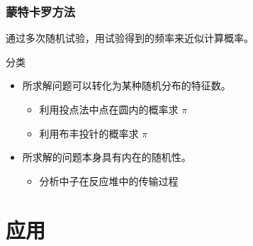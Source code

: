 \documentclass{beamer}
\begin{document}
\begin{frame}
    \frametitle{蒙特卡罗方法}

    \begin{definition}
        通过多次随机试验，用试验得到的频率来近似计算概率。
    \end{definition}

    \begin{block}{分类}
        \begin{itemize}
            \item 所求解问题可以转化为某种随机分布的特征数。
            \begin{itemize}
                \item 利用投点法中点在圆内的概率求 $\pi$
                \item 利用布丰投针的概率求 $\pi$
            \end{itemize}
            \item 所求解的问题本身具有内在的随机性。
            \begin{itemize}
                \item 分析中子在反应堆中的传输过程
            \end{itemize}
        \end{itemize}
    \end{block}
\end{frame}

\section{应用}
\end{document}
